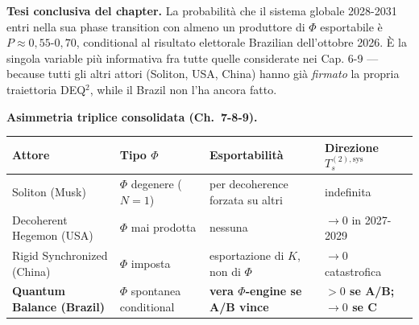 \Hypoth{} \textbf{Tesi conclusiva del chapter.} La probabilità che il
sistema globale 2028-2031 entri nella sua phase transition con almeno
un produttore di \(\Phi\) esportabile è \(P \approx 0{,}55\)-\(0{,}70\),
conditional al risultato elettorale Brazilian dell'ottobre 2026. È la
singola variable più informativa fra tutte quelle considerate nei Cap.
6-9 --- because tutti gli altri attori (Soliton, USA, China) hanno già
\emph{firmato} la propria traiettoria DEQ$^2$, while il Brazil non l'ha
ancora fatto.

\Hypoth{} \textbf{Asimmetria triplice consolidata (Ch.~7-8-9).}

{\def\LTcaptype{none} %
{\small\begin{longtable}[]{@{}
  >{\raggedright\arraybackslash}p{}
  >{\raggedright\arraybackslash}p{}
  >{\raggedright\arraybackslash}p{}
  >{\raggedright\arraybackslash}p{}@{}}
\toprule\noalign{}
\begin{minipage}[b]{\linewidth}\raggedright
Attore
\end{minipage} & \begin{minipage}[b]{\linewidth}\raggedright
Tipo \(\Phi\)
\end{minipage} & \begin{minipage}[b]{\linewidth}\raggedright
Esportabilità
\end{minipage} & \begin{minipage}[b]{\linewidth}\raggedright
Direzione \(T_s^{(2),\text{sys}}\)
\end{minipage} \\
\midrule\noalign{}
\endhead
\bottomrule\noalign{}
\endlastfoot
Soliton (Musk) & \(\Phi\) degenere (\(N=1\)) & per decoherence forzata
su altri & indefinita \\
Decoherent Hegemon (USA) & \(\Phi\) mai prodotta & nessuna & \(\to 0\)
in 2027-2029 \\
Rigid Synchronized (China) & \(\Phi\) imposta & esportazione di \(K\),
non di \(\Phi\) & \(\to 0\) catastrofica \\
\textbf{Quantum Balance (Brazil)} & \(\Phi\) spontanea
conditional & \textbf{vera \(\Phi\)-engine se A/B vince} &
\textbf{\(> 0\) se A/B; \(\to 0\) se C} \\
\end{longtable}}
}



